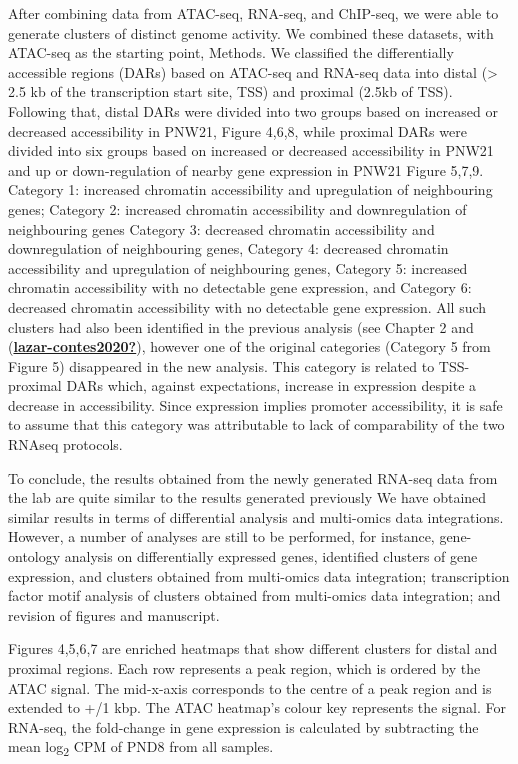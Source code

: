 \documentclass[12pt,twoside]{reedthesis}
\begin{document}
After combining data from ATAC-seq, RNA-seq, and ChIP-seq, we were able
to generate clusters of distinct genome activity. We combined these
datasets, with ATAC-seq as the starting point, Methods. We classified
the differentially accessible regions (DARs) based on ATAC-seq and
RNA-seq data into distal (\textgreater{} 2.5 kb of the transcription start site,
TSS) and proximal (2.5kb of TSS). Following that, distal DARs were
divided into two groups based on increased or decreased accessibility in
PNW21, Figure 4,6,8, while proximal DARs were divided into six groups
based on increased or decreased accessibility in PNW21 and up or
down-regulation of nearby gene expression in PNW21 Figure 5,7,9.
Category 1: increased chromatin accessibility and upregulation of
neighbouring genes; Category 2: increased chromatin accessibility and
downregulation of neighbouring genes Category 3: decreased chromatin
accessibility and downregulation of neighbouring genes, Category 4:
decreased chromatin accessibility and upregulation of neighbouring
genes, Category 5: increased chromatin accessibility with no detectable
gene expression, and Category 6: decreased chromatin accessibility with
no detectable gene expression. All such clusters had also been
identified in the previous analysis (see Chapter 2 and
(\protect\hyperlink{ref-lazar-contes2020}{\textbf{lazar-contes2020?}}), however one of the original categories (Category 5
from Figure 5) disappeared in the new analysis. This category is related
to TSS-proximal DARs which, against expectations, increase in expression
despite a decrease in accessibility. Since expression implies promoter
accessibility, it is safe to assume that this category was attributable
to lack of comparability of the two RNAseq protocols.

To conclude, the results obtained from the newly generated RNA-seq data
from the lab are quite similar to the results generated previously We
have obtained similar results in terms of differential analysis and
multi-omics data integrations. However, a number of analyses are still
to be performed, for instance, gene-ontology analysis on differentially
expressed genes, identified clusters of gene expression, and clusters
obtained from multi-omics data integration; transcription factor motif
analysis of clusters obtained from multi-omics data integration; and
revision of figures and manuscript.

Figures 4,5,6,7 are enriched heatmaps that show different clusters for
distal and proximal regions. Each row represents a peak region, which is
ordered by the ATAC signal. The mid-x-axis corresponds to the centre of
a peak region and is extended to +/1 kbp. The ATAC heatmap's colour key
represents the signal. For RNA-seq, the fold-change in gene expression
is calculated by subtracting the mean log\textsubscript{2} CPM of PND8
from all samples.
\end{document}

